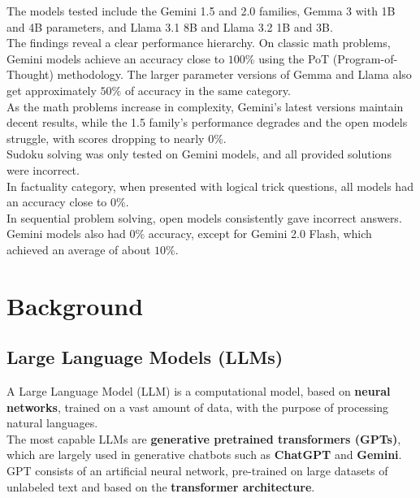 \documentclass[12pt]{article}
\begin{document}
The models tested include the Gemini 1.5 and 2.0 families, Gemma 3 with 1B and 4B parameters, and Llama 3.1 8B and Llama 3.2 1B and 3B.\\
The findings reveal a clear performance hierarchy. On classic math problems, Gemini models achieve an accuracy close to $100\%$ using the PoT (Program-of-Thought) methodology. The larger parameter versions of Gemma and Llama also get approximately $50\%$ of accuracy in the same category. \\
As the math problems increase in complexity, Gemini's latest versions maintain decent results, while the 1.5 family's performance degrades and the open models struggle, with scores dropping to nearly $0\%$.\\
Sudoku solving was only tested on Gemini models, and all provided solutions were incorrect.\\
In factuality category, when presented with logical trick questions, all models had an accuracy close to $0\%$.\\
In sequential problem solving, open models consistently gave incorrect answers. Gemini models also had $0\%$ accuracy, except for Gemini 2.0 Flash, which achieved an average of about $10\%$.

\clearpage
\section{Background}
    \subsection{Large Language Models (LLMs)}
A Large Language Model (LLM) is a computational model, based on \textbf{neural networks}, trained on a vast amount of data, with the purpose of processing natural languages.\\
The most capable LLMs are \textbf{generative pretrained transformers (GPTs)}, which are largely used in generative chatbots such as \textbf{ChatGPT} and \textbf{Gemini}. GPT consists of an artificial neural network, pre-trained on large datasets of unlabeled text and based on the \textbf{transformer architecture}.
\end{document}
